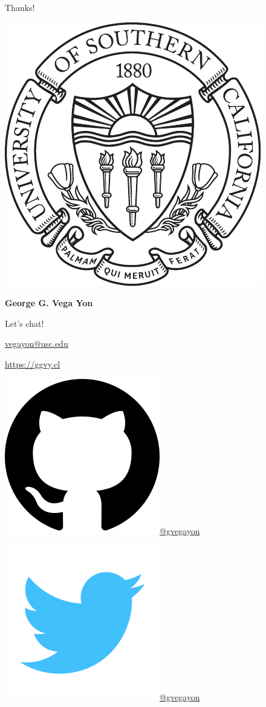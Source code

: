 \documentclass[10pt,ignorenonframetext,aspectratio=169,]{beamer}
\begin{document}
\begin{frame}{Thanks!}
\protect\hypertarget{thanks}{}

\begin{centering}
\includegraphics[width = .1\linewidth]{usc.pdf}

\large \textbf{\textcolor{USCCardinal}{George G. Vega Yon}}

\normalsize Let's chat! 

\href{mailto:vegayon@usc.edu}{vegayon@usc.edu} 

\href{https://ggvy.cl}{https://ggvy.cl} 

\includegraphics[width=.02\linewidth]{github.png}\href{https://github.com/gvegayon}{@gvegayon}

\includegraphics[width=.02\linewidth]{twitter.png}\href{https://twitter.com/gvegayon}{@gvegayon}

\end{centering}

\end{frame}
\end{document}
